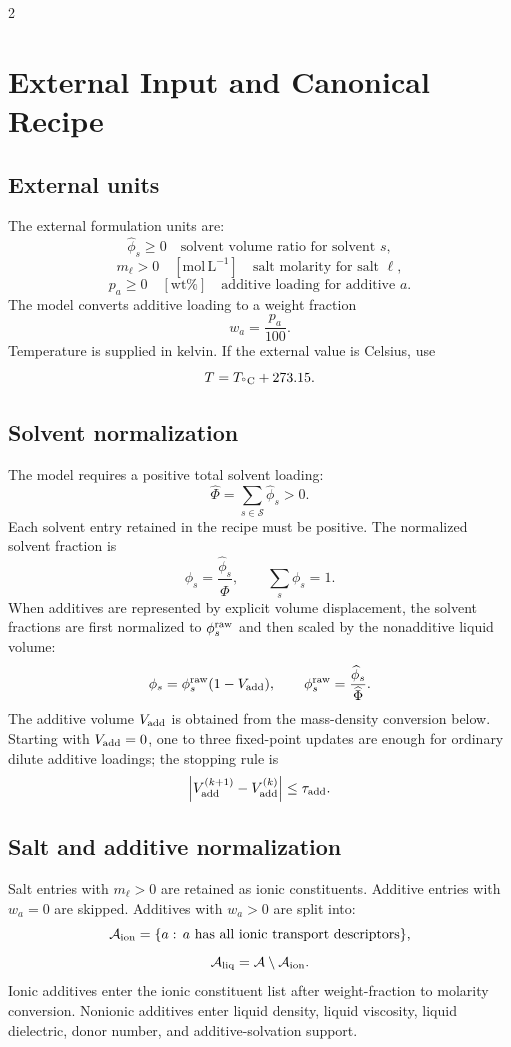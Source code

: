 \documentclass[10pt]{article}
\newcommand{\molL}{\mathrm{mol\,L^{-1}}}
\begin{document}
\begin{multicols}{2}
\section{External Input and Canonical Recipe}

\subsection{External units}

The external formulation units are:
\[
\widehat{\phi}_s \ge 0
\quad\text{solvent volume ratio for solvent }s,
\]
\[
m_\ell>0
\quad [\molL]
\quad\text{salt molarity for salt }\ell,
\]
\[
p_a\ge0
\quad [\mathrm{wt\%}]
\quad\text{additive loading for additive }a.
\]
The model converts additive loading to a weight fraction
\[
w_a = \frac{p_a}{100}.
\]
Temperature is supplied in kelvin. If the external value is Celsius, use
\[
T=T_{{}^\circ{\rm C}}+273.15.
\]

\subsection{Solvent normalization}

The model requires a positive total solvent loading:
\[
\widehat{\Phi}=\sum_{s\in\mathcal S}\widehat{\phi}_s > 0.
\]
Each solvent entry retained in the recipe must be positive. The normalized
solvent fraction is
\[
\phi_s=\frac{\widehat{\phi}_s}{\widehat{\Phi}},
\qquad
\sum_s \phi_s=1.
\]
When additives are represented by explicit volume displacement, the solvent
fractions are first normalized to \(\phi_s^{\rm raw}\) and then scaled by the
nonadditive liquid volume:
\[
\phi_s
=
\phi_s^{\rm raw}(1-V_{\rm add}),
\qquad
\phi_s^{\rm raw}
=
\frac{\widehat{\phi}_s}{\widehat{\Phi}}.
\]
The additive volume \(V_{\rm add}\) is obtained from the mass-density conversion
below. Starting with \(V_{\rm add}=0\), one to three fixed-point updates are
enough for ordinary dilute additive loadings; the stopping rule is
\[
\left|
V_{\rm add}^{(k+1)}-V_{\rm add}^{(k)}
\right|
\le
\tau_{\rm add}.
\]

\subsection{Salt and additive normalization}

Salt entries with \(m_\ell>0\) are retained as ionic constituents. Additive
entries with \(w_a=0\) are skipped. Additives with \(w_a>0\) are split into:
\[
\mathcal A_{\rm ion}
=
\{a:\,a\text{ has all ionic transport descriptors}\},
\]
\[
\mathcal A_{\rm liq}
=
\mathcal A\setminus\mathcal A_{\rm ion}.
\]
Ionic additives enter the ionic constituent list after weight-fraction to
molarity conversion. Nonionic additives enter liquid density, liquid viscosity,
liquid dielectric, donor number, and additive-solvation support.


\end{multicols}
\end{document}
